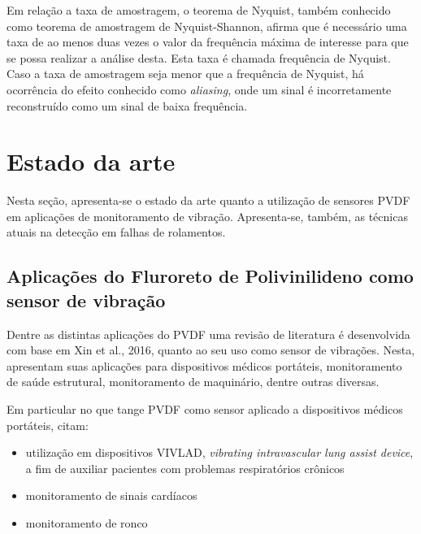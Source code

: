 \documentclass[
	12pt,				
	oneside,			
	a4paper,			
	english,			
	brazil,			
	]{abntex2ppgsi}
\begin{document}

Em relação a taxa de amostragem, o teorema de Nyquist, também conhecido como teorema de amostragem de Nyquist-Shannon, afirma que é necessário uma taxa de ao menos duas vezes o valor da frequência máxima de interesse para que se possa realizar a análise desta. Esta taxa é chamada frequência de Nyquist. Caso a taxa de amostragem seja menor que a frequência de Nyquist, há ocorrência do efeito conhecido como \textit{aliasing}, onde um sinal é incorretamente reconstruído como um sinal de baixa frequência.


\newpage
\chapter{\textbf{Estado da arte}}

Nesta seção, apresenta-se o estado da arte quanto a utilização de sensores PVDF em aplicações de monitoramento de vibração. Apresenta-se, também, as técnicas atuais na detecção em falhas de rolamentos.

\section{\textbf{Aplicações do Fluroreto de Polivinilideno como sensor de vibração}}

Dentre as distintas aplicações do PVDF uma revisão de literatura é desenvolvida com base em Xin et al., 2016, quanto ao seu uso como sensor de vibrações. Nesta, apresentam suas aplicações para dispositivos médicos portáteis, monitoramento de saúde estrutural, monitoramento de maquinário, dentre outras diversas.

Em particular no que tange PVDF como sensor aplicado a dispositivos médicos portáteis, citam:

\begin{itemize}
	\item utilização em dispositivos VIVLAD, \textit{vibrating intravascular lung assist device}, a fim de auxiliar pacientes com problemas respiratórios crônicos 
	\item monitoramento de sinais cardíacos 
	\item monitoramento de ronco 
\end{itemize}
\end{document}
